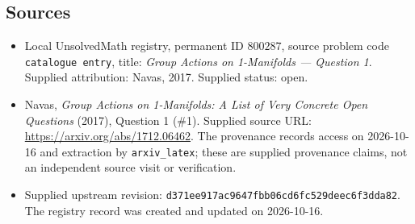 \documentclass[11pt]{article}
\begin{document}
\subsection{Sources}
\begin{itemize}
\item Local UnsolvedMath registry, permanent ID \(800287\), source problem code \texttt{catalogue entry}, title: \emph{Group Actions on 1-Manifolds --- Question 1}. Supplied attribution: Navas, 2017. Supplied status: open.
\item Navas, \emph{Group Actions on 1-Manifolds: A List of Very Concrete Open Questions} (2017), Question 1 (\#1). Supplied source URL: \url{https://arxiv.org/abs/1712.06462}. The provenance records access on 2026-10-16 and extraction by \texttt{arxiv\_latex}; these are supplied provenance claims, not an independent source visit or verification.
\item Supplied upstream revision: \texttt{d371ee917ac9647fbb06cd6fc529deec6f3dda82}. The registry record was created and updated on 2026-10-16.
\end{itemize}
\end{document}
